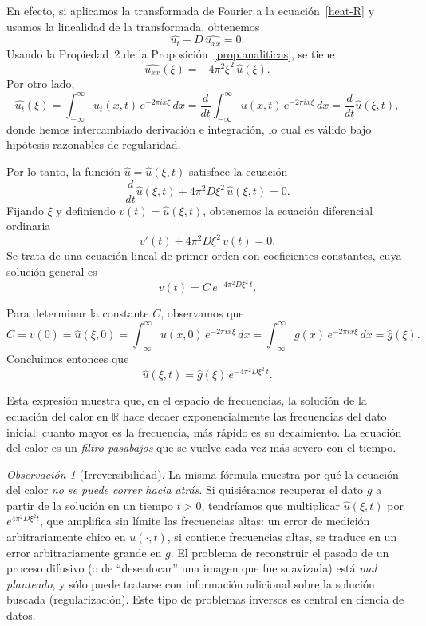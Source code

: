 \documentclass[12pt, a4paper]{amsbook}
\newcommand{\R}{{\mathbb R}}
\theoremstyle{remark}
\newtheorem{obs}[teo]{Observación}
\theoremstyle{definition}
\numberwithin{section}{chapter}
\numberwithin{subsection}{section}
\numberwithin{equation}{section}
\numberwithin{figure}{chapter}
\begin{document}
En efecto, si aplicamos la transformada de Fourier a la ecuación~\eqref{heat-R} y usamos la linealidad de la transformada, obtenemos
\[
\widehat{u_t} - D\,\widehat{u_{xx}} = 0.
\]
Usando la Propiedad~2 de la Proposición~\ref{prop.analiticas}, se tiene
\[
\widehat{u_{xx}}(\xi) = -4\pi^2\xi^2\,\hat u(\xi).
\]
Por otro lado,
\[
\widehat{u_t}(\xi)
= \int_{-\infty}^{\infty} u_t(x,t)\,e^{-2\pi i x\xi}\,dx
= \frac{d}{dt}\int_{-\infty}^{\infty} u(x,t)\,e^{-2\pi i x\xi}\,dx
= \frac{d}{dt}\hat u(\xi,t),
\]
donde hemos intercambiado derivación e integración, lo cual es válido bajo hipótesis razonables de regularidad.

Por lo tanto, la función $\hat u=\hat u(\xi,t)$ satisface la ecuación
\[
\frac{d}{dt}\hat u(\xi,t) + 4\pi^2 D\xi^2\,\hat u(\xi,t) = 0.
\]
Fijando $\xi$ y definiendo $v(t)=\hat u(\xi,t)$, obtenemos la ecuación diferencial ordinaria
\[
v'(t) + 4\pi^2 D\xi^2\,v(t) = 0.
\]
Se trata de una ecuación lineal de primer orden con coeficientes constantes, cuya solución general es
\[
v(t) = C\,e^{-4\pi^2 D\xi^2\,t}.
\]

Para determinar la constante $C$, observamos que
\[
C = v(0) = \hat u(\xi,0)
= \int_{-\infty}^{\infty} u(x,0)\,e^{-2\pi i x\xi}\,dx
= \int_{-\infty}^{\infty} g(x)\,e^{-2\pi i x\xi}\,dx
= \hat g(\xi).
\]
Concluimos entonces que
\begin{equation}\label{hatheat}
\hat u(\xi,t) = \hat g(\xi)\,e^{-4\pi^2 D\xi^2\,t}.
\end{equation}

Esta expresión muestra que, en el espacio de frecuencias, la solución de la ecuación del calor en $\R$ hace decaer exponencialmente las frecuencias del dato inicial: cuanto mayor es la frecuencia, más rápido es su decaimiento. La ecuación del calor es un \emph{filtro pasabajos} que se vuelve cada vez más severo con el tiempo.

\begin{obs}[Irreversibilidad]\label{obs:irreversibilidad}
La misma fórmula muestra por qué la ecuación del calor \emph{no se puede correr hacia atrás}. Si quisiéramos recuperar el dato $g$ a partir de la solución en un tiempo $t>0$, tendríamos que multiplicar $\hat u(\xi,t)$ por $e^{4\pi^2D\xi^2t}$, que amplifica sin límite las frecuencias altas: un error de medición arbitrariamente chico en $u(\cdot,t)$, si contiene frecuencias altas, se traduce en un error arbitrariamente grande en $g$. El problema de reconstruir el pasado de un proceso difusivo (o de ``desenfocar'' una imagen que fue suavizada) está \emph{mal planteado}, y sólo puede tratarse con información adicional sobre la solución buscada (regularización). Este tipo de problemas inversos es central en ciencia de datos.
\end{obs}
\end{document}
